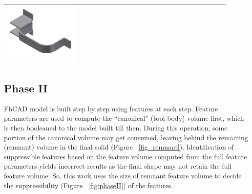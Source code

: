 \begin{minipage}[t]{0.9\linewidth}
\begin{tabular}[h]{@{} p{0.3\linewidth} | p{0.3\linewidth} | p{0.3\linewidth}@{}}
\includegraphics[width=0.98\linewidth]{..//Common/images/DefeatBracketPhase_I_3} \\ \bottomrule

\end{tabular}
\label{fig:phaseI}
\end{minipage}

\subsection{Phase II} \label{ph2}

FbCAD model is built step by step using features at each step. Feature parameters are used to compute the ``canonical'' (tool-body) volume first, which is then booleaned to the model built till then. During this operation, some portion of the canonical volume may get consumed, leaving behind the remaining (remnant) volume in the final solid  (Figure ~\ref{fig_remnant}). Identification of suppressible features based on the feature volume computed from the full feature parameters yields incorrect results \cite{Russ2012} as the final shape may not retain the full feature volume. So, this work uses the size of remnant feature volume to decide the suppressibility  (Figure ~\ref{fig:phaseII}) of the features.


